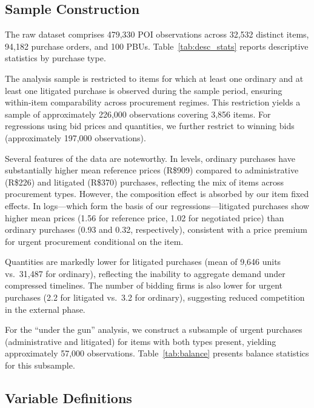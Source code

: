 \subsection{Sample Construction}

The raw dataset comprises 479,330 POI observations across 32,532 distinct items, 94,182 purchase orders, and 100 PBUs. Table~\ref{tab:desc_stats} reports descriptive statistics by purchase type.



The analysis sample is restricted to items for which at least one ordinary and at least one litigated purchase is observed during the sample period, ensuring within-item comparability across procurement regimes. This restriction yields a sample of approximately 226,000 observations covering 3,856 items. For regressions using bid prices and quantities, we further restrict to winning bids (approximately 197,000 observations).

Several features of the data are noteworthy. In levels, ordinary purchases have substantially higher mean reference prices (R\$909) compared to administrative (R\$226) and litigated (R\$370) purchases, reflecting the mix of items across procurement types. However, the composition effect is absorbed by our item fixed effects. In logs---which form the basis of our regressions---litigated purchases show higher mean prices (1.56 for reference price, 1.02 for negotiated price) than ordinary purchases (0.93 and 0.32, respectively), consistent with a price premium for urgent procurement conditional on the item.

Quantities are markedly lower for litigated purchases (mean of 9,646 units vs.\ 31,487 for ordinary), reflecting the inability to aggregate demand under compressed timelines. The number of bidding firms is also lower for urgent purchases (2.2 for litigated vs.\ 3.2 for ordinary), suggesting reduced competition in the external phase.

For the ``under the gun'' analysis, we construct a subsample of urgent purchases (administrative and litigated) for items with both types present, yielding approximately 57,000 observations. Table~\ref{tab:balance} presents balance statistics for this subsample.



\subsection{Variable Definitions}

